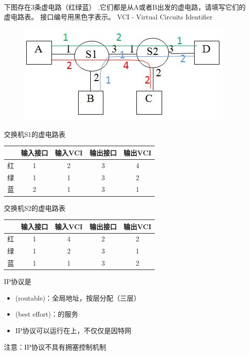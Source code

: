 \begin{example}
	下图存在3条虚电路（红绿蓝） ,它们都是从A或者B出发的虚电路，请填写它们的虚电路表。
	接口编号用黑色字表示。 VCI - Virtual Circuits Identifier
	\begin{figure}[H]
		\centering
		\includegraphics[width=0.4\linewidth]{fig/virtual_circuit.png}
	\end{figure}
\end{example}
\begin{analysis}
交换机S1的虚电路表
\begin{center}
\begin{tabular}{ccccc}\hline
 & 输入接口 & 输入VCI & 输出接口 & 输出VCI\\\hline
红 & 1 & 2 & 3 & 4\\
绿 & 1 & 1 & 3 & 2\\
蓝 & 2 & 1 & 3 & 1\\\hline
\end{tabular}
\end{center}
交换机S2的虚电路表
\begin{center}
\begin{tabular}{ccccc}\hline
 & 输入接口 & 输入VCI & 输出接口 & 输出VCI\\\hline
红 & 1 & 4 & 2 & 2\\
绿 & 1 & 2 & 3 & 1\\
蓝 & 1 & 1 & 3 & 2\\\hline
\end{tabular}
\end{center}
\end{analysis}

\myhline
IP协议是
\begin{itemize}
\item {}(routable)：全局地址，按层分配（三层）
\item {}(best effort)：的服务
\item IP协议可以运行在上，不仅仅是因特网
\end{itemize}
注意：IP协议不具有拥塞控制机制

